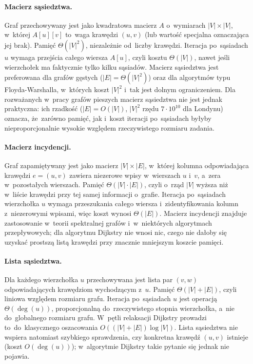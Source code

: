 \paragraph{Macierz sąsiedztwa.}
Graf przechowywany jest jako kwadratowa macierz $A$ o~wymiarach $|V|\times|V|$,
w~której $A[u][v]$ to~waga krawędzi $(u,v)$ (lub wartość specjalna oznaczająca jej brak).
Pamięć $\Theta(|V|^2)$, niezależnie od~liczby krawędzi. Iteracja po~sąsiadach $u$ wymaga
przejścia całego wiersza $A[u]$, czyli kosztu $\Theta(|V|)$, nawet jeśli wierzchołek ma
faktycznie tylko kilku sąsiadów. Macierz sąsiedztwa jest preferowana dla grafów gęstych
($|E|=\Theta(|V|^2)$) oraz dla algorytmów typu Floyda-Warshalla, w~których koszt $|V|^2$
i~tak jest dolnym ograniczeniem. Dla rozważanych w~pracy grafów pieszych macierz sąsiedztwa
nie jest jednak praktyczna: ich rzadkość ($|E|=O(|V|)$, $|V|^2$ rzędu $7\cdot 10^{10}$
dla Londynu) oznacza, że~zarówno pamięć, jak i~koszt iteracji po~sąsiadach byłyby
nieproporcjonalnie wysokie względem rzeczywistego rozmiaru zadania.

\clearpage

\paragraph{Macierz incydencji.}
Graf zapamiętywany jest jako macierz $|V|\times|E|$, w~której kolumna odpowiadająca
krawędzi $e=(u,v)$ zawiera niezerowe wpisy w~wierszach $u$ i~$v$, a~zera w~pozostałych
wierszach. Pamięć $\Theta(|V|\cdot|E|)$, czyli o~rząd $|V|$ wyższa niż w~liście krawędzi
przy tej samej informacji o~grafie. Iteracja po~sąsiadach wierzchołka $u$ wymaga
przeszukania całego wiersza i~zidentyfikowania kolumn z~niezerowymi wpisami, więc koszt
wynosi $\Theta(|E|)$. Macierz incydencji znajduje zastosowanie w~teorii spektralnej grafów
i~w~niektórych algorytmach przepływowych; dla algorytmu Dijkstry
nie wnosi nic, czego nie dałoby się uzyskać prostszą listą krawędzi przy znacznie
mniejszym koszcie pamięci.

\paragraph{Lista sąsiedztwa.}
Dla każdego wierzchołka $u$ przechowywana jest lista par $(v,w)$ odpowiadających krawędziom
wychodzącym z~$u$. Pamięć $\Theta(|V|+|E|)$, czyli liniowa względem rozmiaru grafu.
Iteracja po~sąsiadach $u$ jest operacją $\Theta(\deg(u))$, proporcjonalną do~rzeczywistego
stopnia wierzchołka, a~nie do~globalnego rozmiaru grafu. W~pętli relaksacji Dijkstry
prowadzi to~do~klasycznego oszacowania $O((|V|+|E|)\log|V|)$.
Lista sąsiedztwa nie wspiera natomiast szybkiego
sprawdzenia, czy konkretna krawędź $(u,v)$ istnieje (koszt $O(\deg(u))$); w~algorytmie
Dijkstry takie pytanie się jednak nie pojawia.

